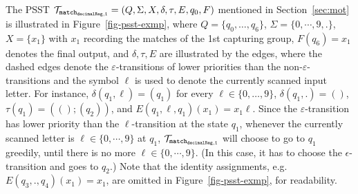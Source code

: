 \begin{example}
The PSST $\mathcal{T}_{\tt match_{decimalReg,1}}=(Q, \Sigma, X, \delta, \tau, E,  q_{0}, F)$ mentioned in Section~\ref{sec:mot} is illustrated in Figure~\ref{fig-psst-exmp}, where $Q = \{q_0, \dots, q_{6}\}$, $\Sigma = \{0,\cdots,9, .\}$, $X= \{x_1\}$ with $x_1$ recording the matches of the 1st capturing group, $F(q_{6}) = x_1$ denotes the final output, and $\delta, \tau, E$ are illustrated by the edges, where the dashed edges denote the $\varepsilon$-transitions of lower priorities than the non-$\varepsilon$-transitions and the symbol $\ell$ is used to denote the currently scanned input letter. For instance, $\delta(q_1, \ell) = (q_1)$ for every $\ell \in \{0, \dots, 9\}$, $\delta(q_1, .) = ()$, $\tau(q_1) = ((); (q_2))$, and $E(q_1, \ell, q_1)(x_1) = x_1 \ell$. Since the $\varepsilon$-transition has lower priority than the $\ell$-transition at the state $q_1$, whenever the currently scanned letter is $\ell \in \{0,\cdots,9\}$ at $q_1$,  $\mathcal{T}_{\tt match_{decimalReg,1}}$ will choose to go to $q_1$ greedily, until there is no more $\ell  \in \{0,\cdots,9\}$. (In this case, it has to choose the $\epsilon$-transition and goes to $q_2$.) Note that the identity assignments, e.g. $E(q_3, ., q_4)(x_1) = x_1$, are omitted in Figure~\ref{fig-psst-exmp}, for readability. 
\begin{figure}[ht]
\centering

\end{figure}
\end{example}
